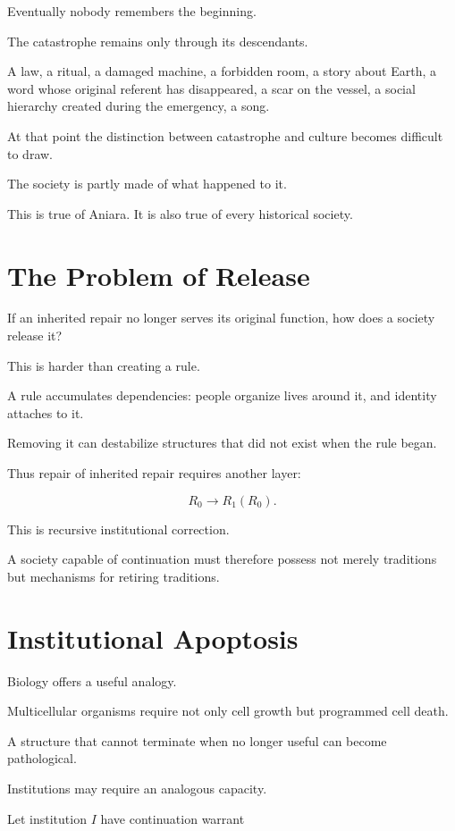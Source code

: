 \documentclass[11pt,oneside]{book}
\theoremstyle{definition}
\theoremstyle{remark}
\begin{document}
Eventually nobody remembers the beginning.

The catastrophe remains only through its descendants.

A law, a ritual, a damaged machine, a forbidden room, a story about Earth, a word whose original referent has disappeared, a scar on the vessel, a social hierarchy created during the emergency, a song.

At that point the distinction between catastrophe and culture becomes difficult to draw.

The society is partly made of what happened to it.

This is true of Aniara. It is also true of every historical society.

\section{The Problem of Release}

If an inherited repair no longer serves its original function, how does a society release it?

This is harder than creating a rule.

A rule accumulates dependencies: people organize lives around it, and identity attaches to it.

Removing it can destabilize structures that did not exist when the rule began.

Thus repair of inherited repair requires another layer:

\[
R_0
\rightarrow
R_1(R_0).
\]

This is recursive institutional correction.

A society capable of continuation must therefore possess not merely traditions but mechanisms for retiring traditions.

\section{Institutional Apoptosis}

Biology offers a useful analogy.

Multicellular organisms require not only cell growth but programmed cell death.

A structure that cannot terminate when no longer useful can become pathological.

Institutions may require an analogous capacity.

Let institution \(I\) have continuation warrant
\end{document}
